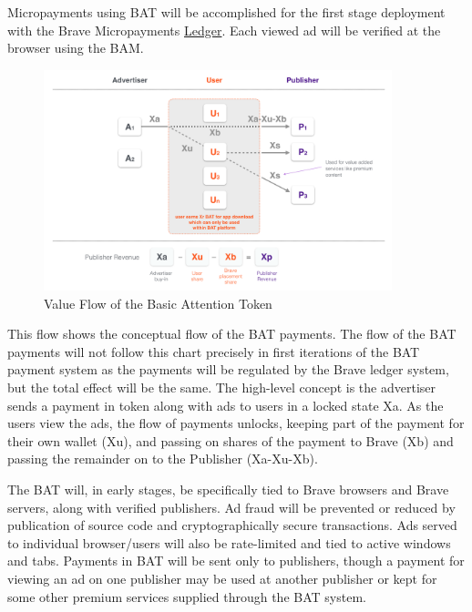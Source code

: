 \documentclass[11pt]{article}
\begin{document}
Micropayments using \textrm{BAT} will be accomplished for the first stage deployment with the Brave Micropayments \href{https://github.com/brave/ledger}{Ledger}. Each viewed ad will be verified at the browser using the BAM. 


\begin{figure}
\begin{center}
\includegraphics[width=0.9\textwidth]{BAT_tokentech_diagram.png}
\caption{Value Flow of the Basic Attention Token}
\end{center}
\end{figure}



This flow shows the conceptual flow of the \textrm{BAT} payments. The flow of the \textrm{BAT} payments will not follow this chart precisely in first iterations of the \textrm{BAT} payment system as the payments will be regulated by the Brave ledger system, but the total effect will be the same. The high-level concept is the advertiser sends a payment in token along with ads to users in a locked state Xa. As the users view the ads, the flow of payments unlocks, keeping part of the payment for their own wallet (Xu), and passing on shares of the payment to Brave (Xb) and passing the remainder on to the Publisher (Xa-Xu-Xb).  

The \textrm{BAT} will, in early stages, be specifically tied to Brave browsers and Brave servers, along with verified publishers. Ad fraud will be prevented or reduced by publication of source code and cryptographically secure transactions. Ads served to individual browser/users will also be rate-limited and tied to active windows and tabs. Payments in \textrm{BAT} will be sent only to publishers, though a payment for viewing an ad on one publisher may be used at another publisher or kept for some other premium services supplied through the \textrm{BAT} system.
\end{document}
